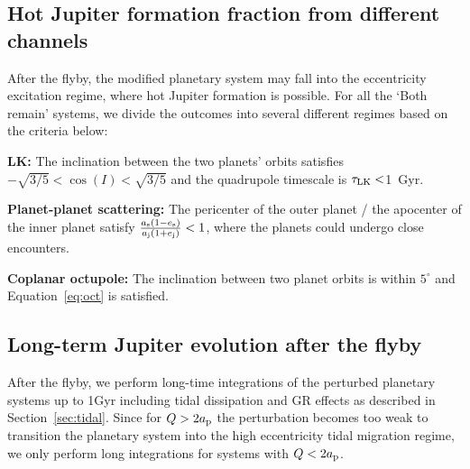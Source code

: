 \documentclass[twocolumn]{aastex63}
\newcommand*\sectn[1]{Section~\ref{#1}}
\newcommand*\eqn[1]{Equation~\ref{#1}}
\begin{document}
\subsection{Hot Jupiter formation fraction from different channels}
After the flyby, the modified planetary system may fall into the eccentricity excitation regime, where hot Jupiter formation is possible. For all the `Both remain' systems, we divide the outcomes into several different regimes based on the criteria below:

\textbf{LK:} The inclination between the two planets' orbits satisfies $-\sqrt{3/5}<\cos(I)<\sqrt{3/5}$ and the quadrupole timescale is $\tau_{\rm LK} <$1~Gyr.

\textbf{Planet-planet scattering:} The pericenter of the outer planet / the apocenter of the inner planet satisfy $\frac{a_{\rm s}(1-e_{\rm s})}{a_{\rm j}(1+e_{\rm j})}<1$, where the planets could undergo close encounters.

\textbf{Coplanar octupole:} The inclination between two planet orbits is within $5^\circ$ and \eqn{eq:oct} is satisfied.


\subsection{Long-term Jupiter evolution after the flyby}
After the flyby, we perform long-time integrations of the perturbed planetary systems up to 1Gyr 
including tidal dissipation and GR effects as described in \sectn{sec:tidal}. Since for $Q> 2a_{\rm p}$ the perturbation becomes too weak to transition the planetary system into the high eccentricity tidal migration regime, we only perform long integrations for systems with $Q<2a_{\rm p}$. 
\end{document}
